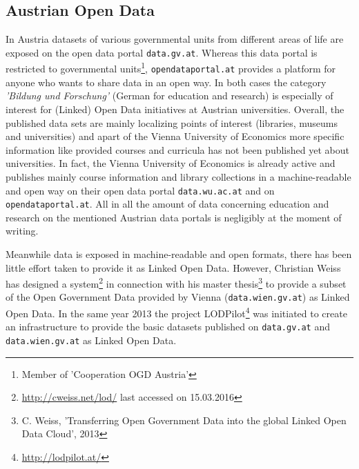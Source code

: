 \documentclass{article}
\begin{document}
\subsection{Austrian Open Data}
\label{related-work:austrian-open-data}
In Austria datasets of various governmental units from different areas of life are exposed on the open data portal \texttt{data.gv.at}. Whereas this data portal is restricted to governmental units\footnote{Member of 'Cooperation OGD Austria'}, \texttt{opendataportal.at} provides a platform for anyone who wants to share data in an open way. In both cases the category \textit{'Bildung und Forschung'} (German for education and research) is especially of interest for (Linked) Open Data initiatives at Austrian universities. Overall, the published data sets are mainly localizing points of interest (libraries, museums and universities) and apart of the Vienna University of Economics more specific information like provided courses and curricula has not been published yet about universities. In fact, the Vienna University of Economics is already active and publishes mainly course information and library collections in a machine-readable and open way on their open data portal \texttt{data.wu.ac.at} and on \texttt{opendataportal.at}. All in all the amount of data concerning education and research on the mentioned Austrian data portals is negligibly at the moment of writing.

Meanwhile data is exposed in machine-readable and open formats, there has been little effort taken to provide it as Linked Open Data. However, Christian Weiss has designed a system\footnote{\url{http://cweiss.net/lod/} last accessed on 15.03.2016} in connection with his master thesis\footnote{C. Weiss, 'Transferring Open Government Data into the global Linked Open Data Cloud', 2013} to provide a subset of the Open Government Data provided by Vienna (\texttt{data.wien.gv.at}) as Linked Open Data. In the same year 2013 the project LODPilot\footnote{\url{http://lodpilot.at/}} was initiated to create an infrastructure to provide the basic datasets published on \texttt{data.gv.at} and \texttt{data.wien.gv.at} as Linked Open Data.
\end{document}
